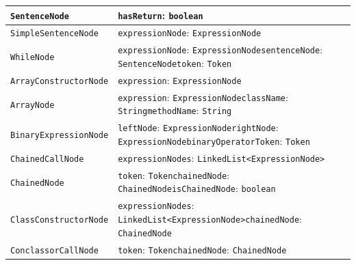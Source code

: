 \begin{longtable}{|>{\raggedright\arraybackslash}p{}|>{\raggedright\arraybackslash}p{}|}
\texttt{Sentence\allowbreak Node} & \texttt{has\allowbreak Return}: \texttt{boolean} \\ \hline
\texttt{Simple\allowbreak Sentence\allowbreak Node} & \texttt{expression\allowbreak Node}: \texttt{Expression\allowbreak Node} \\ \hline
\texttt{While\allowbreak Node} & \texttt{expression\allowbreak Node}: \texttt{Expression\allowbreak Node}\newline \texttt{sentence\allowbreak Node}: \texttt{Sentence\allowbreak Node}\newline \texttt{token}: \texttt{Token} \\ \hline
\texttt{Array\allowbreak Constructor\allowbreak Node} & \texttt{expression}: \texttt{Expression\allowbreak Node} \\ \hline
\texttt{Array\allowbreak Node} & \texttt{expression}: \texttt{Expression\allowbreak Node}\newline \texttt{class\allowbreak Name}: \texttt{String}\newline \texttt{method\allowbreak Name}: \texttt{String} \\ \hline
\texttt{Binary\allowbreak Expression\allowbreak Node} & \texttt{left\allowbreak Node}: \texttt{Expression\allowbreak Node}\newline \texttt{right\allowbreak Node}: \texttt{Expression\allowbreak Node}\newline \texttt{binary\allowbreak Operator\allowbreak Token}: \texttt{Token} \\ \hline
\texttt{Chained\allowbreak Call\allowbreak Node} & \texttt{expression\allowbreak Nodes}: \texttt{Linked\allowbreak List<Expression\allowbreak Node>} \\ \hline
\texttt{Chained\allowbreak Node} & \texttt{token}: \texttt{Token}\newline \texttt{chained\allowbreak Node}: \texttt{Chained\allowbreak Node}\newline \texttt{is\allowbreak Chained\allowbreak Node}: \texttt{boolean} \\ \hline
\texttt{Class\allowbreak Constructor\allowbreak Node} & \texttt{expression\allowbreak Nodes}: \texttt{Linked\allowbreak List<Expression\allowbreak Node>}\newline \texttt{chained\allowbreak Node}: \texttt{Chained\allowbreak Node} \\ \hline
\texttt{Conclassor\allowbreak Call\allowbreak Node} & \texttt{token}: \texttt{Token}\newline \texttt{chained\allowbreak Node}: \texttt{Chained\allowbreak Node} \\ \hline

\end{longtable}
